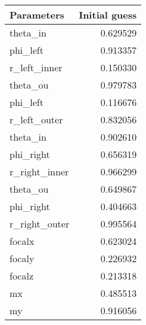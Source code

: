 \begin{tabular}{lr}
\toprule
    Parameters &  Initial guess \\
\midrule
      theta\_in &       0.629529 \\
      phi\_left &       0.913357 \\
  r\_left\_inner &       0.150330 \\
      theta\_ou &       0.979783 \\
      phi\_left &       0.116676 \\
  r\_left\_outer &       0.832056 \\
      theta\_in &       0.902610 \\
     phi\_right &       0.656319 \\
 r\_right\_inner &       0.966299 \\
      theta\_ou &       0.649867 \\
     phi\_right &       0.404663 \\
 r\_right\_outer &       0.995564 \\
        focalx &       0.623024 \\
        focaly &       0.226932 \\
        focalz &       0.213318 \\
            mx &       0.485513 \\
            my &       0.916056 \\
\bottomrule
\end{tabular}
